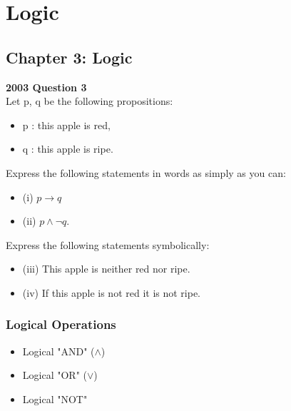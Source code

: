 \documentclass[]{report}
\begin{document}
\chapter{Logic}

\section{Chapter 3: Logic}

\textbf{2003 Question 3}\\
Let p, q be the following propositions:
\begin{itemize}
	\item p : this apple is red, 
	\item q : this apple is ripe.
\end{itemize}

Express the following statements in words as simply as you can:
\begin{itemize}
	\item (i) $p \rightarrow q$
	\item (ii) $p \wedge \neg q$.
\end{itemize}


Express the following statements symbolically:
\begin{itemize}
	\item (iii) This apple is neither red nor ripe.
	\item (iv) If this apple is not red it is not ripe.
\end{itemize}



\subsection{Logical Operations}

\begin{itemize}
	\item Logical "AND" ($\wedge$)
	\item Logical "OR" ($\vee$)
	\item Logical "NOT" 
\end{itemize}
\newpage
\end{document}
